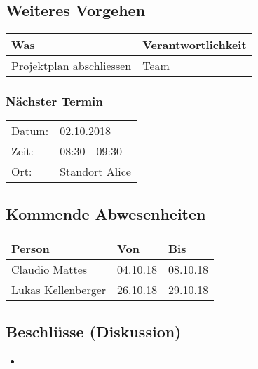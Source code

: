 \vspace{1cm}

\subsection*{Weiteres Vorgehen}
\begin{table}[H]
    \centering
    \begin{tabular}{p{12cm} p{4cm}}
        \textbf{Was} & \textbf{Verantwortlichkeit} \\ \hline
        Projektplan abschliessen & Team \\ \hline
    \end{tabular}
\end{table}

\subsubsection*{Nächster Termin}

\begin{tabular}{p{4cm} p{12cm}}
    Datum: & 02.10.2018 \\
    Zeit: & 08:30 - 09:30 \\
    Ort: & Standort Alice \\
\end{tabular}

\vspace{1cm}

\subsection*{Kommende Abwesenheiten}
\begin{table}[H]
    \centering
    \begin{tabular}{p{6cm} p{5cm} p{5cm}}
        \textbf{Person} & \textbf{Von} & \textbf{Bis} \\ \hline
        Claudio Mattes & 04.10.18 & 08.10.18 \\ \hline
        Lukas Kellenberger & 26.10.18 & 29.10.18 \\ \hline
    \end{tabular}
\end{table}

\subsection*{Beschlüsse (Diskussion)}
\begin{itemize}
    \item 
\end{itemize}

